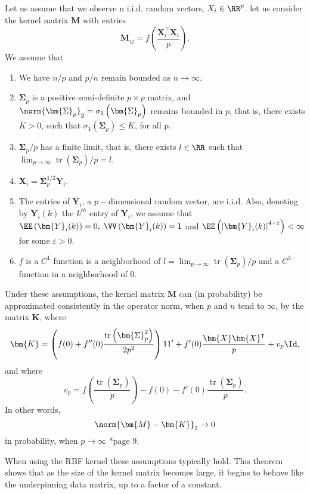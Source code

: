 \begin{thm} \label{thm: inner-prof-kern-mat}
    Let us assume that we observe n i.i.d. random vectors, $X_i \in \RR^{p}$. let us consider the kernel matrix $\bm{M}$ with entries
    \begin{equation*}
        \bm{M}_{ij} = f \left( \frac{\bm{X}_{i}^{\intercal} \bm{X}_{i}}{p} \right).
    \end{equation*}
    We assume that
    \begin{enumerate}
        \item We have $n/p$ and $p/n$ remain bounded as $n \to \infty$.
        \item $\bm{\Sigma}_{p}$ is a positive semi-definite $p \times p$ matrix, and $\norm{\bm{\Sigma}_{p}}_2 = \sigma_1 \left( \bm{\Sigma}_{p} \right)$ remains bounded in $p$, that is, there exists $K > 0$, such that $\sigma_1 \left( \bm{\Sigma}_{p} \right) \leq K$, for all p.
        \item $\bm{\Sigma}_{p} / p$ has a finite limit, that is, there exists $l \in \RR$ such that $\lim_{p \to \infty} \operatorname{tr} \left( \bm{\Sigma}_{p} \right) / p = l$.
        \item $\bm{X}_{i} = \bm{\Sigma}_{p}^{1/2} \bm{Y}_{i}$.
        \item The entries of $\bm{Y}_{i}$, a $p-$dimensional random vector, are i.i.d. Also, denoting by $\bm{Y}_{i} (k)$ the $k^{th}$ entry of $\bm{Y}_{i}$, we assume that $\EE \left( \bm{Y}_{i} (k) \right) = 0, \; \VV \left( \bm{Y}_{i} (k) \right) = 1$ and $\EE \left( \left| \bm{Y}_{i} (k) \right|^{4 + \varepsilon} \right) < \infty$ for some $\varepsilon > 0$.
        \item $f$ is a $C^{1}$ function is a neighborhood of $l = \lim_{p \to \infty} \operatorname{tr} \left( \bm{\Sigma}_{p} \right) / p$ and a $C^3$ function in a neighborhood of $0$.
    \end{enumerate}
    Under these assumptions, the kernel matrix $\bm{M}$ can (in probability) be approximated consistently in the operator norm, when $p$ and $n$ tend to $\infty$, by the matrix $\bm{K}$, where
    \begin{equation*}
        \bm{K} = \left( f(0) + f''(0) \frac{\operatorname{tr} \left( \bm{\Sigma}_{p}^{2} \right)}{2p^2} \right) 11' + f'(0) \frac{\bm{X} \bm{X}^{\intercal}}{p} + v_{p} \Id,
    \end{equation*}
    and where
    \begin{equation*}
        v_{p} = f \left( \frac{\operatorname{tr} \left( \bm{\Sigma}_{p} \right)}{p} \right) - f(0) - f'(0) \frac{\operatorname{tr} \left( \bm{\Sigma}_{p} \right)}{p}.
    \end{equation*}
    In other words,
    \begin{equation*}
        \norm{\bm{M} - \bm{K}}_2 \to 0
    \end{equation*}
    in probability, when $p \to \infty$ \cite{KarouiNoureddineEl2010TSOK}*{page 9}.
\end{thm}

When using the RBF kernel these assumptions typically hold. This theorem shows that as the size of the kernel matrix becomes large, it begins to behave like the underpinning data matrix, up to a factor of a constant.